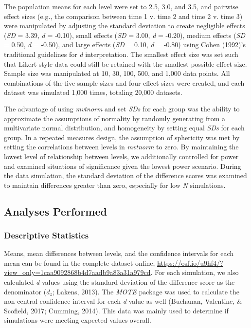 \documentclass[,man, mask]{apa6}
\theoremstyle{definition}
\theoremstyle{definition}
\theoremstyle{definition}
\theoremstyle{remark}
\begin{document}
The population means for each level were set to 2.5, 3.0, and 3.5, and
pairwise effect sizes (e.g., the comparison between time 1 v. time 2 and
time 2 v. time 3) were manipulated by adjusting the standard deviation
to create negligible effects (\emph{SD} = 3.39, \emph{d} = -0.10), small
effects (\emph{SD} = 3.00, \emph{d} = -0.20), medium effects (\emph{SD}
= 0.50, \emph{d} = -0.50), and large effects (\emph{SD} = 0.10, \emph{d}
= -0.80) using Cohen (1992)'s traditional guidelines for \emph{d}
interpretation. The smallest effect size was set such that Likert style
data could still be retained with the smallest possible effect size.
Sample size was manipulated at 10, 30, 100, 500, and 1,000 data points.
All combinations of the five sample sizes and four effect sizes were
created, and each dataset was simulated 1,000 times, totaling 20,000
datasets.

The advantage of using \emph{mvtnorm} and set \emph{SDs} for each group
was the ability to approximate the assumptions of normality by randomly
generating from a multivariate normal distribution, and homogeneity by
setting equal \emph{SDs} for each group. In a repeated measures design,
the assumption of sphericity was met by setting the correlations between
levels in \emph{mvtnorm} to zero. By maintaining the lowest level of
relationship between levels, we additionally controlled for power and
examined situations of significance given the lowest power scenario.
During the data simulation, the standard deviation of the difference
scores was examined to maintain differences greater than zero,
especially for low \emph{N} simulations.

\subsection{Analyses Performed}\label{analyses-performed}

\subsubsection{Descriptive Statistics}\label{descriptive-statistics}

Means, mean differences between levels, and the confidence intervals for
each mean can be found in the complete dataset online,
\url{https://osf.io/u9hf4/?view_only=1caa9092868b4d7aadb9a83a31a979cd}.
For each simulation, we also calculated \emph{d} values using the
standard deviation of the difference score as the denominator
(\(d_{z}\); Lakens, 2013). The \emph{MOTE} package was used to calculate
the non-central confidence interval for each \emph{d} value as well
(Buchanan, Valentine, \& Scofield, 2017; Cumming, 2014). This data was
mainly used to determine if simulations were meeting expected values
overall.
\end{document}
